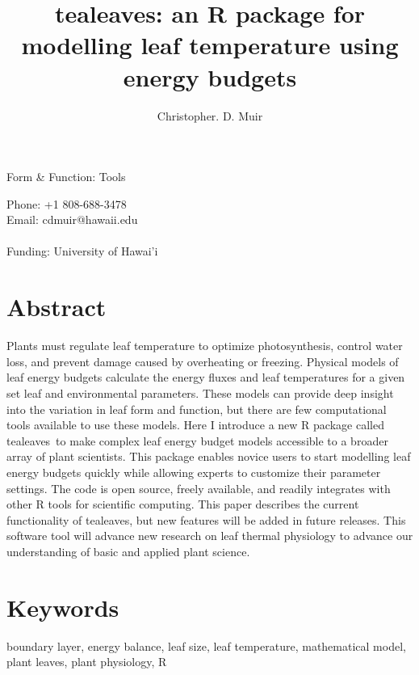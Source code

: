 \documentclass[11pt, oneside]{article}
\newcommand{\pkg}[1]{{\fontseries{b}\selectfont #1}}
\newcommand{\tealeaves}{\pkg{tealeaves}}
\begin{document}
\title{\tealeaves: an R package for modelling leaf temperature using energy budgets}
\author[1]{Christopher. D. Muir}
\date{} %

\begin{center}
Form \& Function: Tools 
\end{center}

{\let\newpage\relax\maketitle}

Phone: +1 808-688-3478 \\
Email: cdmuir@hawaii.edu \\
\\
Funding: University of Hawai'i

\section*{Abstract}

Plants must regulate leaf temperature to optimize photosynthesis, control water loss, and prevent damage caused by overheating or freezing. Physical models of leaf energy budgets calculate the energy fluxes and leaf temperatures for a given set leaf and environmental parameters. These models can provide deep insight into the variation in leaf form and function, but there are few computational tools available to use these models. Here I introduce a new R package called \tealeaves~to make complex leaf energy budget models accessible to a broader array of plant scientists. This package enables novice users to start modelling leaf energy budgets quickly while allowing experts to customize their parameter settings. The code is open source, freely available, and readily integrates with other R tools for scientific computing. This paper describes the current functionality of \tealeaves, but new features will be added in future releases. This software tool will advance new research on leaf thermal physiology to advance our understanding of basic and applied plant science.

\section*{Keywords}

boundary layer, energy balance, leaf size, leaf temperature, mathematical model, plant leaves, plant physiology, R
\end{document}
